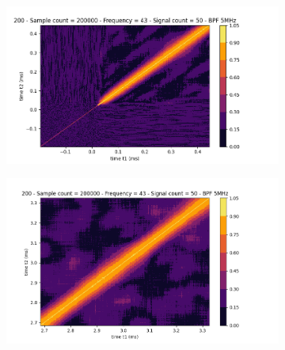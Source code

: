 \documentclass[11pt]{report}
\begin{document}
\begin{figure}[h!]
\centering
\begin{subfigure}{.48\textwidth}
  \centering
  \includegraphics[width=1.1\linewidth]{sp-g12-1}
\end{subfigure}%
\hspace{1em}%
\begin{subfigure}{.48\textwidth}
  \centering
  \includegraphics[width=1.1\linewidth]{sp-g12-3}
\end{subfigure}
\end{figure}
\end{document}
